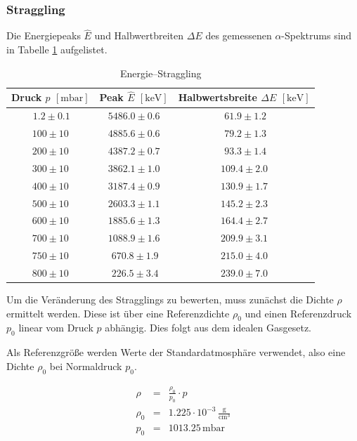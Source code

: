 \documentclass[12pt,a4paper]{scrartcl}
\numberwithin{equation}{section} %
\begin{document}
\hypertarget{energiestraggling-straggling}{%
	\subsubsection{Straggling}\label{energiestraggling-straggling}}
Die Energiepeaks $\hat E$ und Halbwertbreiten $\Delta E$ des gemessenen $\alpha$-Spektrums sind in Tabelle \ref{tabelle: Straggling} aufgelistet.
\begin{table}
	\centering
	\begin{tabular}[h]{c|c|c}
		Druck $p$ $[\mathrm{mbar}]$ & Peak $\hat E$ $[\mathrm{keV}]$ & Halbwertsbreite $\Delta E$ $[\mathrm{keV}]$  \\
		\hline
		$\ 1.2 \pm 0.1$ & $5486.0 \pm 0.6$ & $\ 61.9 \pm 1.2$ \\
		$100 \pm 10$ & $4885.6 \pm 0.6$ & $\ 79.2 \pm 1.3$ \\
		$200 \pm 10$ & $4387.2 \pm 0.7$ & $\ 93.3 \pm 1.4$ \\
		$300 \pm 10$ & $3862.1 \pm 1.0$ & $109.4 \pm 2.0$ \\
		$400 \pm 10$ & $3187.4 \pm 0.9$ & $130.9 \pm 1.7$ \\
		$500 \pm 10$ & $2603.3 \pm 1.1$ & $145.2 \pm 2.3$ \\
		$600 \pm 10$ & $1885.6 \pm 1.3$ & $164.4 \pm 2.7$ \\
		$700 \pm 10$ & $1088.9 \pm 1.6$ & $209.9 \pm 3.1$ \\
		$750 \pm 10$ & $\ 670.8 \pm 1.9$ & $215.0 \pm 4.0$ \\
		$800 \pm 10$ & $\ 226.5 \pm 3.4$ & $239.0 \pm 7.0$ \\
	\end{tabular}
	\caption{Energie--Straggling}
	\label{tabelle: Straggling}
\end{table}

Um die Veränderung des Stragglings zu bewerten, muss zunächst die Dichte $\rho$ ermittelt werden. Diese ist über eine Referenzdichte $\rho_0$ und einen Referenzdruck $p_0$ linear vom Druck $p$ abhängig.  Dies folgt aus dem idealen Gasgesetz.

Als Referenzgröße werden Werte der Standardatmosphäre verwendet, also eine Dichte $\rho_0$ bei Normaldruck $p_0$. \cite{DWD}

\begin{eqnarray}
	\rho &=& \frac{\rho_0}{p_0} \cdot p \\
	\rho_0 &=& 1.225 \cdot 10^{-3}\mathrm{\,\frac{g}{cm^3}} \\
	p_0 &=& 1013.25 \mathrm{\,mbar}
\end{eqnarray}
\end{document}
